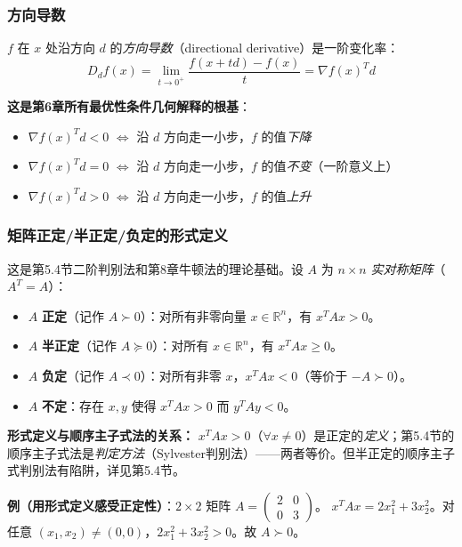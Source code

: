 \subsubsection{方向导数}

$f$ 在 $x$ 处沿方向 $d$ 的\emph{方向导数}（directional derivative）是一阶变化率：
\[
D_d f(x) = \lim_{t\to 0^+} \frac{f(x+td)-f(x)}{t} = \nabla f(x)^T d
\]

\textbf{这是第6章所有最优性条件几何解释的根基}：
\begin{itemize}
  \item $\nabla f(x)^T d < 0$ $\Longleftrightarrow$ 沿 $d$ 方向走一小步，$f$ 的值\emph{下降}
  \item $\nabla f(x)^T d = 0$ $\Longleftrightarrow$ 沿 $d$ 方向走一小步，$f$ 的值\emph{不变}（一阶意义上）
  \item $\nabla f(x)^T d > 0$ $\Longleftrightarrow$ 沿 $d$ 方向走一小步，$f$ 的值\emph{上升}
\end{itemize}

\subsubsection{矩阵正定/半正定/负定的形式定义}

这是第5.4节二阶判别法和第8章牛顿法的理论基础。设 $A$ 为 $n\times n$ \emph{实对称矩阵}（$A^T=A$）：

\begin{itemize}
  \item $A$ \textbf{正定}（记作 $A \succ 0$）：对所有非零向量 $x\in\mathbb{R}^n$，有 $x^T A x > 0$。
  \item $A$ \textbf{半正定}（记作 $A \succeq 0$）：对所有 $x\in\mathbb{R}^n$，有 $x^T A x \ge 0$。
  \item $A$ \textbf{负定}（记作 $A \prec 0$）：对所有非零 $x$，$x^T A x < 0$（等价于 $-A \succ 0$）。
  \item $A$ \textbf{不定}：存在 $x,y$ 使得 $x^T A x > 0$ 而 $y^T A y < 0$。
\end{itemize}

\textbf{形式定义与顺序主子式法的关系：} $x^T A x > 0$（$\forall x\neq0$）是正定的\emph{定义}；第5.4节的顺序主子式法是\emph{判定方法}（Sylvester判别法）——两者等价。但半正定的顺序主子式判别法有陷阱，详见第5.4节。

\textbf{例（用形式定义感受正定性）}：$2\times2$ 矩阵 $A=\begin{pmatrix}2&0\\0&3\end{pmatrix}$。
$x^T A x = 2x_1^2 + 3x_2^2$。对任意 $(x_1,x_2)\neq(0,0)$，$2x_1^2+3x_2^2 > 0$。故 $A \succ 0$。

